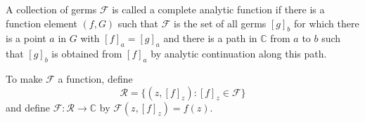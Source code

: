 A collection of germs $\mathcal{F}$ is called a complete analytic function if there is a function element $(f, G)$ such that $\mathcal{F}$ is the set of all germs $[g]_b$ for which there is a point $a$ in $G$ with $[f]_a = [g]_a$ and there is a path in $\mathbb{C}$ from $a$ to $b$ such that $[g]_b$ is obtained from $[f]_a$ by analytic continuation along this path.

To make $\mathcal{F}$ a function, define
$$\mathcal{R} = \{(z, [f]_z): [f]_z \in \mathcal{F}\}$$
and define $\mathcal{F}: \mathcal{R} \to \mathbb{C}$ by $\mathcal{F}(z, [f]_z) = f(z)$.
